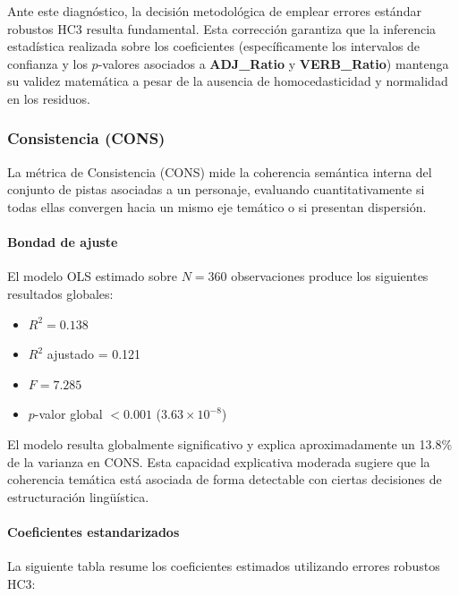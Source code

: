 \documentclass[../main.tex]{subfiles}
\begin{document}
Ante este diagnóstico, la decisión metodológica de emplear errores estándar robustos HC3 resulta fundamental. Esta corrección garantiza que la inferencia estadística realizada sobre los coeficientes (específicamente los intervalos de confianza y los $p$-valores asociados a \textbf{ADJ\_Ratio} y \textbf{VERB\_Ratio}) mantenga su validez matemática a pesar de la ausencia de homocedasticidad y normalidad en los residuos.

\subsubsection{Consistencia (CONS)}

La métrica de Consistencia (CONS) mide la coherencia semántica interna del conjunto de pistas asociadas a un personaje, evaluando cuantitativamente si todas ellas convergen hacia un mismo eje temático o si presentan dispersión.

\paragraph{Bondad de ajuste}

El modelo OLS estimado sobre $N = 360$ observaciones produce los siguientes resultados globales:

\begin{itemize}
\item $R^2 = 0.138$
\item $R^2$ ajustado = 0.121
\item $F = 7.285$
\item $p$-valor global $< 0.001$ ($3.63 \times 10^{-8}$)
\end{itemize}

El modelo resulta globalmente significativo y explica aproximadamente un 13.8\% de la varianza en CONS. Esta capacidad explicativa moderada sugiere que la coherencia temática está asociada de forma detectable con ciertas decisiones de estructuración lingüística.

\paragraph{Coeficientes estandarizados}

La siguiente tabla resume los coeficientes estimados utilizando errores robustos HC3:
\end{document}
